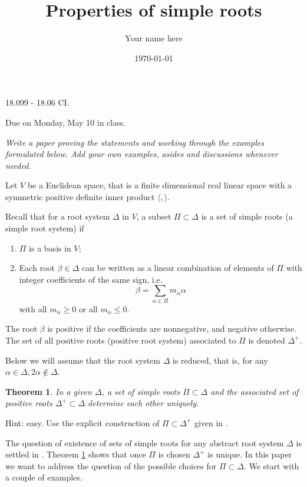 \documentclass[11pt]{amsart}
\newcommand{\la}{\langle}
\newcommand{\ra}{\rangle}
\newtheorem{theorem}{Theorem}
\begin{document}
\title{Properties of simple roots}
\author{Your name here}
\date{\today}
\maketitle


{\Large  18.099 - 18.06 CI.} 

{Due on Monday, May 10 in class.} 

\vspace{1cm} 

{\it Write a paper proving the statements and working through the examples 
formulated below. Add your own 
examples, asides and discussions whenever needed. }



Let $V$ be a Euclidean space, that is 
a finite dimensional real linear space with a symmetric 
positive definite inner product $\la, \ra$. 

Recall that for a root system $\Delta$ in  
$V$,
a subset $\Pi \subset \Delta$ is a set of simple roots (a simple root system)
if \begin{enumerate}
\item{ $\Pi$ is a basis in $V$;}
\item{Each root $\beta \in \Delta$ can be written as a linear 
combination of elements of $\Pi$ with integer coefficients of the same sign,
i.e.
$$ \beta = \sum_{\alpha \in \Pi} m_\alpha \alpha $$
with all $m_\alpha \geq 0$ or all $m_\alpha \leq 0$.} 
\end{enumerate} 
 The root $\beta$ is 
positive if the coefficients are nonnegative, and negative otherwise. 
The set of all positive roots (positive root system) 
associated to $\Pi$ is denoted $\Delta^+$. 

Below we will assume that the root system $\Delta$ is reduced, that is, 
for any $\alpha \in \Delta, 2 \alpha \notin \Delta$.

\begin{theorem} \label{sim-pos} 
In a given $\Delta$, a set of simple roots $\Pi \subset \Delta$ 
and the associated set of positive roots 
$\Delta^+ \subset \Delta$ determine each other uniquely.
\end{theorem} 
Hint: easy. Use the explicit construction of $\Pi \subset \Delta^+$ given 
in \cite{3}.

The question of existence of sets of simple roots  for any abstract root 
system $\Delta$ is settled in \cite{3}.  Theorem \ref{sim-pos} 
shows that once $\Pi$ is chosen $\Delta^+$ is unique. 
In this paper we want to address the question of the possible choices for 
$\Pi \subset \Delta$. We start with a couple of examples. 
\end{document}
